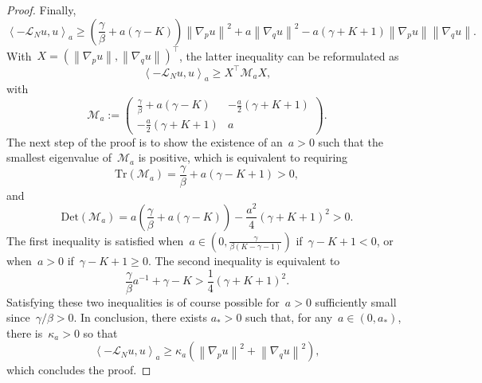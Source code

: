 \documentclass[10pt,a4paper]{amsart}
\renewcommand{\geq}{\geqslant}
\newcommand{\mc}[1]{\mathcal{#1}}
\newcommand{\norm}[1]{\left\lVert#1\right\rVert}
\newcommand{\slangle}[1]{\left\langle #1 \right\rangle}
\begin{document}
\begin{proof}
Finally,
\[
\slangle{-\mc{L}_N  u , u}_a \geq \left(\frac{\gamma}{\beta} + a(\gamma - K)\right)\norm{\nabla_p  u}^2 + a \norm{\nabla_q u}^2 -a(\gamma + K +1)\norm{\nabla_p u}\norm{\nabla_q u}.
\]
With~$X = (\norm{\nabla_p u},\norm{\nabla_q u})^\top$, the latter inequality can be reformulated as
\[
\slangle{-\mc{L}_N u ,u}_a \geq X^\top\mc{M}_aX,
\]
with
\[
\mc{M}_a :=\begin{pmatrix}
            \displaystyle\frac{\gamma}{\beta} + a(\gamma - K) & \displaystyle-\frac{a}{2}(\gamma + K + 1) \\
            \displaystyle-\frac{a}{2}(\gamma + K + 1) & a
            \end{pmatrix}.
\]
The next step of the proof is to show the existence of an~$a >0$ such that the smallest eigenvalue of~$\mc{M}_a$ is positive, which is equivalent to requiring
$$
\text{Tr}(\mc{M}_a) = \frac{\gamma}{\beta} + a(\gamma - K +1) >0,
$$
and
$$
\text{Det}(\mc{M}_a) = a\left(\frac{\gamma}{\beta} + a(\gamma - K)\right)-\frac{a^2}{4}(\gamma + K + 1)^2>0.
$$
The first inequality is satisfied when~$a \in \left(0,\displaystyle\frac{\gamma}{\beta(K - \gamma -1)}\right)$ if~$\gamma - K +1 <0$, or when~$a>0$ if~$\gamma - K +1 \geq 0$. 
The second inequality is equivalent to
\[
\frac{\gamma}{\beta}a^{-1}+\gamma - K > \frac14(\gamma + K + 1)^2.
\]
Satisfying these two inequalities is of course possible for~$a>0$ sufficiently small since~$\gamma/\beta >0$. In conclusion, there exists $a_*>0$ such that, for any~$a \in (0,a_*)$, there is~$\kappa_a >0$ so that
\[
\slangle{-\mc{L}_N u ,u}_a \geq \kappa_a \left(\norm{\nabla_p u}^2+\norm{\nabla_q u}^2\right),
\]
which concludes the proof.
\end{proof}
\end{document}
